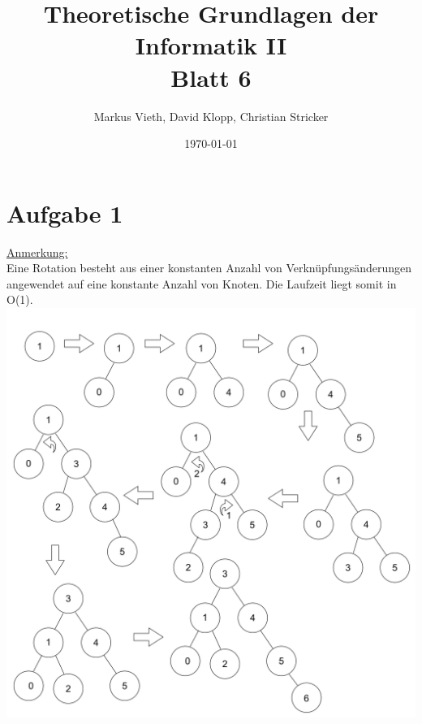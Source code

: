 \documentclass[a4paper,11pt,twoside]{article}
\title{Theoretische Grundlagen der Informatik II\\ Blatt 6}
\author{Markus Vieth, David Klopp, Christian Stricker}
\date{\today}
\begin{document}
\maketitle
\cleardoublepage
\pagestyle{myheadings}

\section*{Aufgabe 1}
\underline{Anmerkung: }\\ Eine Rotation besteht aus einer konstanten Anzahl von Verknüpfungsänderungen angewendet auf eine konstante Anzahl von Knoten. Die Laufzeit liegt somit in O(1). \\
\includegraphics*[scale=0.2]{Images/Nr_1.png}
\end{document}
